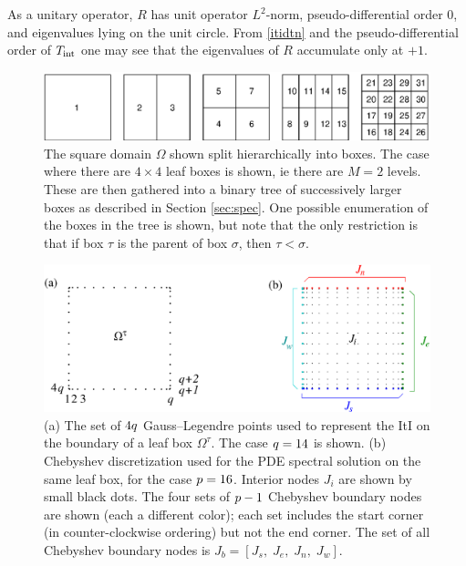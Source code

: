 \documentclass[11pt,final]{amsart}
\theoremstyle{definition}
\numberwithin{remark}{section}
\numberwithin{definition}{section}
\numberwithin{pro}{section}
\begin{document}
As a unitary operator, $R$ has unit operator $L^2$-norm, pseudo-differential
order $0$, and eigenvalues lying on the unit circle. From \eqref{itidtn}
and the pseudo-differential order of $T_{\rm int}$
one may see that the eigenvalues of $R$ accumulate only at $+1$.


\begin{figure} %
\includegraphics[width=\textwidth]{fig_tree_numbering.eps}
\caption{The square domain $\Omega$ shown split hierarchically into boxes.
The case where there are $4 \times 4$ leaf boxes is shown,
ie there are $M=2$ levels.
These are then gathered into a binary tree of successively larger boxes
as described in Section \ref{sec:spec}. One possible enumeration
of the boxes in the tree is shown, but note that the only restriction is
that if box $\tau$ is the parent of box $\sigma$, then $\tau < \sigma$.}
\label{fig:tree_numbering}
\end{figure}


\begin{figure} %
\includegraphics[width = \textwidth]{leafgeom.eps}
\caption{\label{f:leafgeom} (a) The set of $4q$ Gauss--Legendre points used
to represent the ItI on the boundary of a leaf box $\Omega^\tau$.
The case $q = 14$ is shown.
(b) Chebyshev discretization used for the PDE spectral solution on the same
leaf box, for the case $p = 16$.
Interior nodes $J_i$ are shown by small black dots.
The four sets of $p-1$ Chebyshev
boundary nodes are shown (each a different color);
each set includes the start corner
(in counter-clockwise ordering) but not the end corner.
The set of all Chebyshev boundary nodes is $J_b = [J_s, \;J_e,\; J_n,\; J_w]$.
}
\end{figure}
\end{document}
